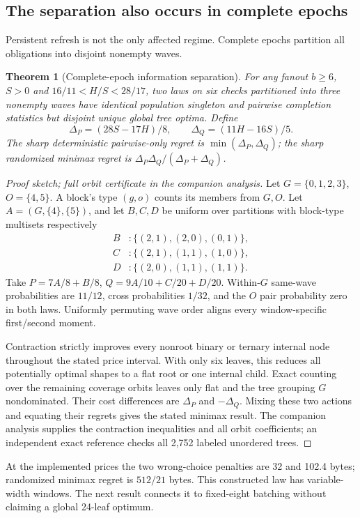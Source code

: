 \documentclass[10pt,journal,compsoc]{IEEEtran}
\newtheorem{theorem}{Theorem}
\theoremstyle{definition}\newtheorem{definition}[theorem]{Definition}
\begin{document}
\subsection{The separation also occurs in complete epochs}
Persistent refresh is not the only affected regime. Complete epochs
partition all obligations into disjoint nonempty waves.
\begin{theorem}[Complete-epoch information separation]\label{thm:strict-pairwise}
For any fanout $b\ge6$, $S>0$ and $16/11<H/S<28/17$, two laws on six
checks partitioned into three nonempty waves have identical population
singleton and pairwise completion statistics but disjoint unique global
tree optima. Define
\[
 \Delta_P=(28S-17H)/8,\qquad \Delta_Q=(11H-16S)/5.
\]
The sharp deterministic pairwise-only regret is
$\min(\Delta_P,\Delta_Q)$; the sharp randomized minimax regret is
$\Delta_P\Delta_Q/(\Delta_P+\Delta_Q)$.
\end{theorem}
\begin{proof}[Proof sketch; full orbit certificate in the companion analysis]
Let $G=\{0,1,2,3\}$, $O=\{4,5\}$. A block's type $(g,o)$ counts its
members from $G,O$. Let $A=(G,\{4\},\{5\})$, and let $B,C,D$ be uniform
over partitions with block-type multisets respectively
\begin{align*}
 B&:\{(2,1),(2,0),(0,1)\},\\
 C&:\{(2,1),(1,1),(1,0)\},\\
 D&:\{(2,0),(1,1),(1,1)\}.
\end{align*}
Take $P=7A/8+B/8$, $Q=9A/10+C/20+D/20$.
Within-$G$ same-wave probabilities are $11/12$, cross probabilities
$1/32$, and the $O$ pair probability zero in both laws. Uniformly
permuting wave order aligns every window-specific first/second moment.

Contraction strictly improves every nonroot binary or ternary internal
node throughout the stated price interval. With only six leaves, this
reduces all potentially optimal shapes to a flat root or one internal
child. Exact counting over the remaining coverage orbits leaves only
flat and the tree grouping $G$ nondominated. Their cost differences are
$\Delta_P$ and $-\Delta_Q$. Mixing these two actions and equating their
regrets gives the stated minimax result. The companion analysis supplies
the contraction inequalities and all orbit coefficients; an independent
exact reference checks all 2,752 labeled unordered trees.
\end{proof}
At the implemented prices the two wrong-choice penalties are 32 and
102.4 bytes; randomized minimax regret is $512/21$ bytes. This constructed
law has variable-width windows. The next result connects it to fixed-eight
batching without claiming a global 24-leaf optimum.
\end{document}
